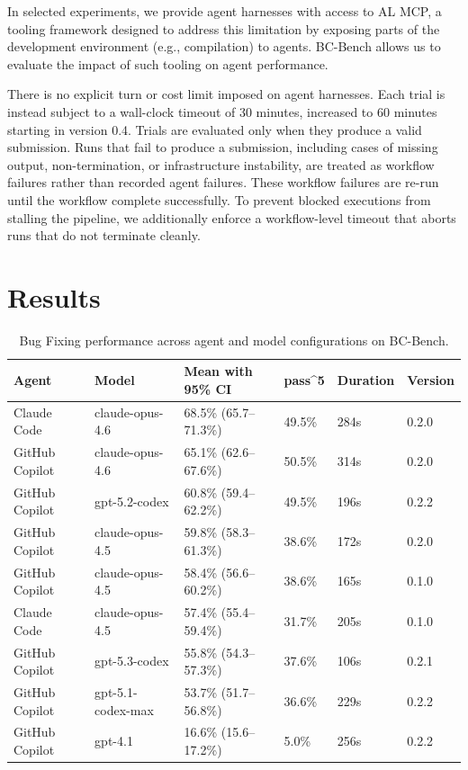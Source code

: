 \documentclass{article}
\newcommand{\passk}[1]{pass\textasciicircum #1}
\begin{document}
In selected experiments, we provide agent harnesses with access to AL MCP, a tooling framework designed to address this limitation by exposing parts of the development environment (e.g., compilation) to agents. BC-Bench allows us to evaluate the impact of such tooling on agent performance.

There is no explicit turn or cost limit imposed on agent harnesses. Each trial is instead subject to a wall-clock timeout of 30 minutes, increased to 60 minutes starting in version 0.4. Trials are evaluated only when they produce a valid submission. Runs that fail to produce a submission, including cases of missing output, non-termination, or infrastructure instability, are treated as workflow failures rather than recorded agent failures. These workflow failures are re-run until the workflow complete successfully. To prevent blocked executions from stalling the pipeline, we additionally enforce a workflow-level timeout that aborts runs that do not terminate cleanly.

\section{Results}

\begin{table}[t]
\vskip 0.05in
\begin{center}
\begin{small}
\begin{sc}
\begin{tabular}{llllll}
\toprule
\textbf{Agent} & \textbf{Model} & \textbf{Mean with 95\% CI} & \textbf{\passk{5}} & \textbf{Duration} & \textbf{Version} \\
\midrule
Claude Code & claude-opus-4.6 & 68.5\% (65.7--71.3\%) & 49.5\% & 284s & 0.2.0 \\
GitHub Copilot & claude-opus-4.6 & 65.1\% (62.6--67.6\%) & 50.5\% & 314s & 0.2.0 \\
GitHub Copilot & gpt-5.2-codex & 60.8\% (59.4--62.2\%) & 49.5\% & 196s & 0.2.2 \\
GitHub Copilot & claude-opus-4.5 & 59.8\% (58.3--61.3\%) & 38.6\% & 172s & 0.2.0 \\
GitHub Copilot & claude-opus-4.5 & 58.4\% (56.6--60.2\%) & 38.6\% & 165s & 0.1.0 \\
Claude Code & claude-opus-4.5 & 57.4\% (55.4--59.4\%) & 31.7\% & 205s & 0.1.0 \\
GitHub Copilot & gpt-5.3-codex & 55.8\% (54.3--57.3\%) & 37.6\% & 106s & 0.2.1 \\
GitHub Copilot & gpt-5.1-codex-max & 53.7\% (51.7--56.8\%) & 36.6\% & 229s & 0.2.2 \\
GitHub Copilot & gpt-4.1 & 16.6\% (15.6--17.2\%) & 5.0\% & 256s & 0.2.2 \\
\bottomrule
\end{tabular}
\end{sc}
\end{small}
\end{center}
\caption{Bug Fixing performance across agent and model configurations on BC-Bench.}
\label{tab:bugfix_results}
\vskip 0.1in
\end{table}
\end{document}
